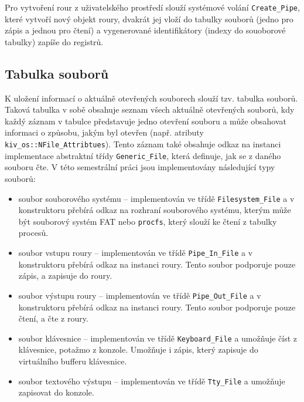 \documentclass[12pt, a4paper]{article}
\begin{document}
Pro vytvoření rour z uživatelského prostředí slouží systémové volání \texttt{Create\_Pipe}, které vytvoří nový objekt roury, dvakrát jej vloží do tabulky souborů (jedno pro zápis a jednou pro čtení) a vygenerované identifikátory (indexy do souoborové tabulky) zapíše do registrů.


\subsection{Tabulka souborů}
K uložení informací o aktuálně otevřených souborech slouží tzv. tabulka souborů. Taková tabulka v sobě obsahuje seznam všech aktuálně otevřených souborů, kdy každý záznam v tabulce představuje jedno otevření souboru a může obsahovat informaci o způsobu, jakým byl otevřen (např. atributy \texttt{kiv\_os::NFile\_Attribtues}). Tento záznam také obsahuje odkaz na instanci implementace abstraktní třídy \texttt{Generic\_File}, která definuje, jak se z daného souboru čte. V této semestrální práci jsou implementovány následující typy souborů:

\begin{itemize}

    \item soubor souborového systému -- implementován ve třídě \texttt{Filesystem\_File} a v konstruktoru přebírá odkaz na rozhraní souborového systému, kterým může být souborový systém FAT nebo \texttt{procfs}, který slouží ke čtení z tabulky procesů.

    \item soubor vstupu roury -- implementován ve třídě \texttt{Pipe\_In\_File} a v konstruktoru přebírá odkaz na instanci roury. Tento soubor podporuje pouze zápis, a zapisuje do roury.

    \item soubor výstupu roury -- implementován ve třídě \texttt{Pipe\_Out\_File} a v konstruktoru přebírá odkaz na instanci roury. Tento soubor podporuje pouze čtení, a čte z roury.

    \item soubor klávesnice -- implementován ve třídě \texttt{Keyboard\_File} a umožňuje číst z klávesnice, potažmo z konzole. Umožňuje i zápis, který zapisuje do virtuálního bufferu klávesnice.

    \item soubor textového výstupu -- implementován ve třídě \texttt{Tty\_File} a umožňuje zapisovat do konzole.

\end{itemize}
\end{document}
